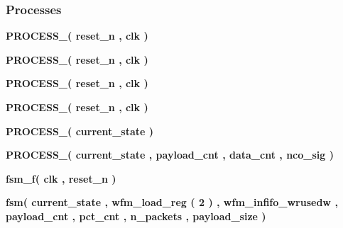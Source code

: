 \subsubsection*{Processes}
 \begin{DoxyCompactItemize}
\item 
{\bf P\+R\+O\+C\+E\+S\+S\+\_}{\bfseries  ( {\bfseries {\bfseries {\bf reset\+\_\+n}} \textcolor{vhdlchar}{ }} , {\bfseries {\bfseries {\bf clk}} \textcolor{vhdlchar}{ }} )}
\item 
{\bf P\+R\+O\+C\+E\+S\+S\+\_}{\bfseries  ( {\bfseries {\bfseries {\bf reset\+\_\+n}} \textcolor{vhdlchar}{ }} , {\bfseries {\bfseries {\bf clk}} \textcolor{vhdlchar}{ }} )}
\item 
{\bf P\+R\+O\+C\+E\+S\+S\+\_}{\bfseries  ( {\bfseries {\bfseries {\bf reset\+\_\+n}} \textcolor{vhdlchar}{ }} , {\bfseries {\bfseries {\bf clk}} \textcolor{vhdlchar}{ }} )}
\item 
{\bf P\+R\+O\+C\+E\+S\+S\+\_}{\bfseries  ( {\bfseries {\bfseries {\bf reset\+\_\+n}} \textcolor{vhdlchar}{ }} , {\bfseries {\bfseries {\bf clk}} \textcolor{vhdlchar}{ }} )}
\item 
{\bf P\+R\+O\+C\+E\+S\+S\+\_}{\bfseries  ( {\bfseries {\bfseries {\bf current\+\_\+state}} \textcolor{vhdlchar}{ }} )}
\item 
{\bf P\+R\+O\+C\+E\+S\+S\+\_}{\bfseries  ( {\bfseries {\bfseries {\bf current\+\_\+state}} \textcolor{vhdlchar}{ }} , {\bfseries {\bfseries {\bf payload\+\_\+cnt}} \textcolor{vhdlchar}{ }} , {\bfseries {\bfseries {\bf data\+\_\+cnt}} \textcolor{vhdlchar}{ }} , {\bfseries {\bfseries {\bf nco\+\_\+sig}} \textcolor{vhdlchar}{ }} )}
\item 
{\bf fsm\+\_\+f}{\bfseries  ( {\bfseries {\bfseries {\bf clk}} \textcolor{vhdlchar}{ }} , {\bfseries {\bfseries {\bf reset\+\_\+n}} \textcolor{vhdlchar}{ }} )}
\item 
{\bf fsm}{\bfseries  ( {\bfseries {\bfseries {\bf current\+\_\+state}} \textcolor{vhdlchar}{ }} , {\bfseries {\bfseries {\bf wfm\+\_\+load\+\_\+reg}} \textcolor{vhdlchar}{(}\textcolor{vhdlchar}{ } \textcolor{vhdldigit}{2} \textcolor{vhdlchar}{)}\textcolor{vhdlchar}{ }} , {\bfseries {\bfseries {\bf wfm\+\_\+infifo\+\_\+wrusedw}} \textcolor{vhdlchar}{ }} , {\bfseries {\bfseries {\bf payload\+\_\+cnt}} \textcolor{vhdlchar}{ }} , {\bfseries {\bfseries {\bf pct\+\_\+cnt}} \textcolor{vhdlchar}{ }} , {\bfseries {\bfseries {\bf n\+\_\+packets}} \textcolor{vhdlchar}{ }} , {\bfseries {\bfseries {\bf payload\+\_\+size}} \textcolor{vhdlchar}{ }} )}
\end{DoxyCompactItemize}
